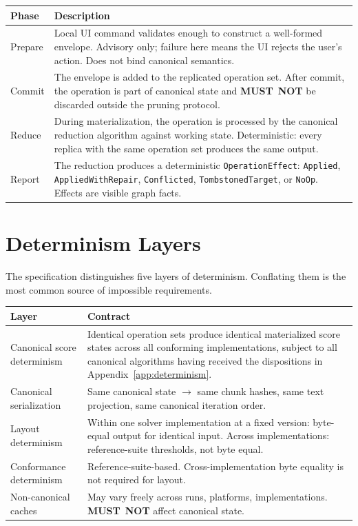 \documentclass[11pt,letterpaper]{report}
\newcounter{requirement}[chapter]
\newcommand{\MUSTNOT}{\textbf{MUST}\nobreak\ \textbf{NOT}}
\begin{document}
\begin{longtable}{p{2.2cm} p{12.5cm}}
  \toprule
  \textbf{Phase} & \textbf{Description} \\
  \midrule
  \endhead
  Prepare & Local UI command validates enough to construct a
    well-formed envelope. Advisory only; failure here means the
    UI rejects the user's action. Does not bind canonical
    semantics. \\
  Commit & The envelope is added to the replicated operation
    set. After commit, the operation is part of canonical state
    and \MUSTNOT{} be discarded outside the pruning protocol. \\
  Reduce & During materialization, the operation is processed
    by the canonical reduction algorithm against working state.
    Deterministic: every replica with the same operation set
    produces the same output. \\
  Report & The reduction produces a deterministic
    \texttt{OperationEffect}: \texttt{Applied},
    \texttt{AppliedWithRepair}, \texttt{Conflicted},
    \texttt{TombstonedTarget}, or \texttt{NoOp}. Effects are
    visible graph facts. \\
  \bottomrule
\end{longtable}

\section*{Determinism Layers}

The specification distinguishes five layers of determinism.
Conflating them is the most common source of impossible
requirements.

\begin{longtable}{p{3.8cm} p{10.0cm}}
  \toprule
  \textbf{Layer} & \textbf{Contract} \\
  \midrule
  \endhead
  Canonical score determinism &
    Identical operation sets produce identical materialized
    score states across all conforming implementations, subject
    to all canonical algorithms having received the dispositions
    in Appendix~\ref{app:determinism}. \\
  Canonical serialization &
    Same canonical state $\to$ same chunk hashes, same text
    projection, same canonical iteration order. \\
  Layout determinism &
    Within one solver implementation at a fixed version:
    byte-equal output for identical input. Across
    implementations: reference-suite thresholds, not byte equal. \\
  Conformance determinism &
    Reference-suite-based. Cross-implementation byte equality
    is not required for layout. \\
  Non-canonical caches &
    May vary freely across runs, platforms, implementations.
    \MUSTNOT{} affect canonical state. \\
  \bottomrule
\end{longtable}
\end{document}
